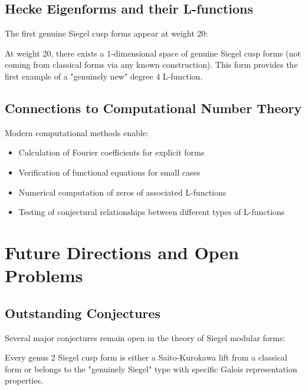 \subsection{Hecke Eigenforms and their L-functions}

The first genuine Siegel cusp forms appear at weight 20:

\begin{example}
At weight 20, there exists a 1-dimensional space of genuine Siegel cusp forms (not coming from classical forms via any known construction). This form provides the first example of a "genuinely new" degree 4 L-function.
\end{example}

\subsection{Connections to Computational Number Theory}

Modern computational methods enable:
\begin{itemize}
\item Calculation of Fourier coefficients for explicit forms
\item Verification of functional equations for small cases
\item Numerical computation of zeros of associated L-functions
\item Testing of conjectural relationships between different types of L-functions
\end{itemize}

\section{Future Directions and Open Problems}
\label{sec:future_directions}

\subsection{Outstanding Conjectures}

Several major conjectures remain open in the theory of Siegel modular forms:

\begin{conjecture}
Every genus 2 Siegel cusp form is either a Saito-Kurokawa lift from a classical form or belongs to the "genuinely Siegel" type with specific Galois representation properties.
\end{conjecture}

